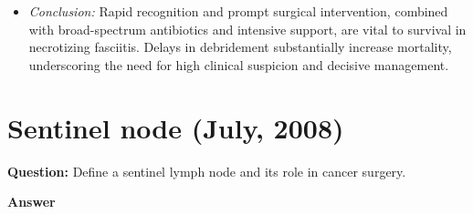 \documentclass{article}
\begin{document}
\begin{itemize}
\item \emph{Conclusion:} Rapid recognition and prompt surgical intervention, combined with broad-spectrum antibiotics and intensive support, are vital to survival in necrotizing fasciitis. Delays in debridement substantially increase mortality, underscoring the need for high clinical suspicion and decisive management.


\end{itemize}

\section{Sentinel node (July, 2008)}

\textbf{Question:} Define a sentinel lymph node and its role in cancer surgery.

\textbf{Answer}
\end{document}
